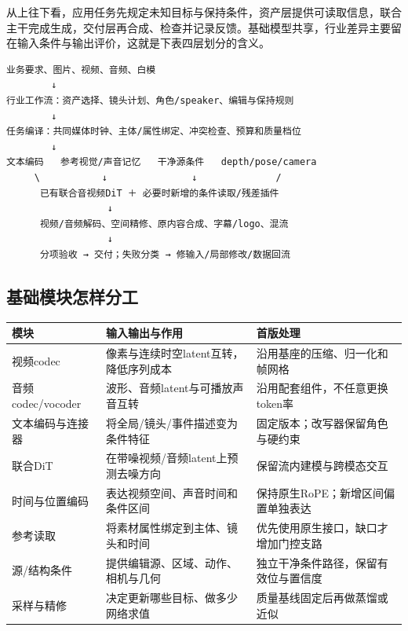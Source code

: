从上往下看，应用任务先规定未知目标与保持条件，资产层提供可读取信息，联合主干完成生成，交付层再合成、检查并记录反馈。基础模型共享，行业差异主要留在输入条件与输出评价，这就是下表四层划分的含义。

\begin{verbatim}
业务要求、图片、视频、音频、白模
        ↓
行业工作流：资产选择、镜头计划、角色/speaker、编辑与保持规则
        ↓
任务编译：共同媒体时钟、主体/属性绑定、冲突检查、预算和质量档位
        ↓
文本编码   参考视觉/声音记忆   干净源条件   depth/pose/camera
     \           ↓               ↓              /
      已有联合音视频DiT ＋ 必要时新增的条件读取/残差插件
                  ↓
      视频/音频解码、空间精修、原内容合成、字幕/logo、混流
                  ↓
      分项验收 → 交付；失败分类 → 修输入/局部修改/数据回流
\end{verbatim}

\subsection{基础模块怎样分工}\label{seedance-m27-ux57faux7840ux6a21ux5757ux600eux6837ux5206ux5de5}

{\def\LTcaptype{table} %
\small\setlength{\tabcolsep}{3pt}\renewcommand{\arraystretch}{1.18}
\begin{longtable}[]{@{}
  >{\raggedright\arraybackslash}p{}
  >{\raggedright\arraybackslash}p{}
  >{\raggedright\arraybackslash}p{}@{}}
\toprule\noalign{}
\begin{minipage}[b]{\linewidth}\raggedright
模块
\end{minipage} & \begin{minipage}[b]{\linewidth}\raggedright
输入输出与作用
\end{minipage} & \begin{minipage}[b]{\linewidth}\raggedright
首版处理
\end{minipage} \\
\midrule\noalign{}
\endhead
\bottomrule\noalign{}
\endlastfoot
视频codec & 像素与连续时空latent互转，降低序列成本 & 沿用基座的压缩、归一化和帧网格 \\
音频codec/vocoder & 波形、音频latent与可播放声音互转 & 沿用配套组件，不任意更换token率 \\
文本编码与连接器 & 将全局/镜头/事件描述变为条件特征 & 固定版本；改写器保留角色与硬约束 \\
联合DiT & 在带噪视频/音频latent上预测去噪方向 & 保留流内建模与跨模态交互 \\
时间与位置编码 & 表达视频空间、声音时间和条件区间 & 保持原生RoPE；新增区间偏置单独表达 \\
参考读取 & 将素材属性绑定到主体、镜头和时间 & 优先使用原生接口，缺口才增加门控支路 \\
源/结构条件 & 提供编辑源、区域、动作、相机与几何 & 独立干净条件路径，保留有效位与置信度 \\
采样与精修 & 决定更新哪些目标、做多少网络求值 & 质量基线固定后再做蒸馏或近似 \\
\end{longtable}
}

